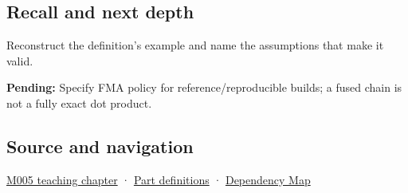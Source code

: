 \subsection{Recall and next depth}\label{appendix-41e8ef22a21e-recall-and-next-depth}

Reconstruct the definition's example and name the assumptions that make it valid.

\textbf{Pending:} Specify FMA policy for reference/reproducible builds; a fused chain is not a fully exact dot product.

\subsection{Source and navigation}\label{appendix-41e8ef22a21e-source-and-navigation}

\hyperref[01-foundations-i-ch001-when-arithmetic-meets-uncertainty]{M005 teaching chapter} · \hyperref[appendix-fd090d982a15-m005---parts-77-88]{Part definitions} · \hyperref[appendix-4ad47bdd269a]{Dependency Map}

